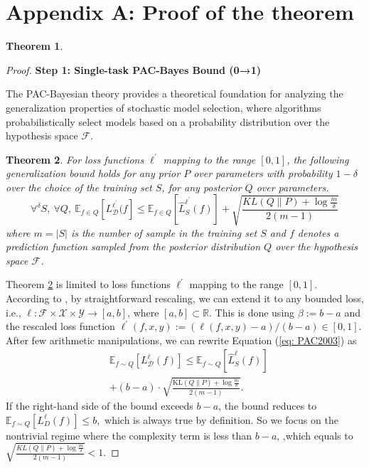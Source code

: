 \documentclass[letterpaper]{article} %
\newtheorem{theorem}{Theorem}
\begin{document}
\appendix

\section{Appendix A: Proof of the theorem}

\begin{theorem}
    
\end{theorem}




\begin{proof}
\textbf{Step 1: Single-task PAC-Bayes Bound (0→1)}

The PAC-Bayesian theory provides a theoretical foundation for analyzing the generalization properties of stochastic model selection, where algorithms probabilistically select models based on a probability distribution over the hypothesis space \(\mathcal{F}\). 


\begin{theorem} \label{the: PAC1999}
\citep{mcallesterPACBayesianStochasticModel2003}
For loss functions $\ell^{'}$ mapping to the range $[0,1]$, the following generalization bound holds for any prior $P$ over parameters with probability $1 - \delta$ over the choice of the training set $S$, for any posterior $Q$ over parameters.
\begin{equation}\label{eq: PAC2003}
     \forall^{\delta}S,\ \forall Q,\ \mathbb{E}_{f \in Q}[L_{\mathcal{D}}^{\ell^{'}}(f] \leq  \mathbb{E}_{f \in Q}[\hat{L}^{\ell^{'}}_{S}(f)] +\sqrt{\frac{KL(Q\|P)+\log \frac{m}{\delta}}{2(m-1)}}
\end{equation}
where $m=|S|$ is the number of sample in the training set $S$ and $f$ denotes a prediction function sampled from the posterior distribution $Q$ over the hypothesis space $\mathcal{F}$.
\end{theorem}

Theorem \ref{the: PAC1999} is limited to loss functions $\ell^{'}$ mapping to the range $[0,1]$. According to \citep{germainPACBayesianTheoryMeets2016}, by straightforward rescaling, we can extend it to any bounded loss, i.e., $\ell: \mathcal{F} \times \mathcal{X} \times \mathcal{Y} \rightarrow[a, b]$, where $[a, b] \subset \mathbb{R}$. This is done using $\beta:=b-a$ and the rescaled loss function $\ell^{\prime}(f, x, y):=(\ell(f, x, y)-a) /(b-a) \in[0,1]$. After few arithmetic manipulations, we can rewrite Equation (\ref{eq: PAC2003}) as
\begin{equation}
\begin{aligned}
        &\mathbb{E}_{f \sim Q}[{L}_\mathcal{D}^{\ell}(f)] \leq \mathbb{E}_{f\sim Q}[\widehat{{L}}_S^{\ell}(f)] \\
        &+ (b - a) \cdot \sqrt{\frac{\mathrm{KL}(Q \| P) + \log \frac{m}{\delta}}{2(m - 1)}} .
\end{aligned}
\end{equation}
If the right-hand side of the bound exceeds $b-a$, the bound reduces to
$\mathbb{E}_{f \sim Q}[L_D^{\ell}(f)] \leq b,$
which is always true by definition. So we focus on the nontrivial regime where the complexity term is less than $b-a$, ,which equals to
$\sqrt{\frac{KL(Q\|P)+\log \frac{m}{\delta}}{2(m-1)}} <1. $


\end{proof}
\end{document}
